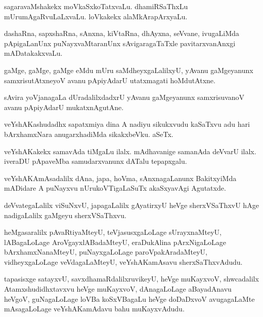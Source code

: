 \documentclass{article}
\begin{document}
\begin{mn}%
sagaravaMshakekx moVkaSxkoTatxvaLu. dhamiRSaThxLu mUrumAgaRvuLaLxvaLu. loVkakekx 
alaMkArapArxyaLu.
\end{mn}

\begin{mn}%
dashaRna, sapxshaRna, sAnxna, kiVtaRna, dhAyxna, seVvane, ivugaLiMda pApigaLanUnx 
puNayxvaMtaranUnx sAvigaragaTaTxle pavitarxvanAnxgi mADatakakxvaLu.
\end{mn}

\begin{mn}%
gaMge, gaMge, gaMge eMdu mUru saMdheyxgaLalilxyU, yAvanu gaMgeyanunx samxrisutAtxneyoV 
avanu pApiyAdarU utatxmagati hoMdutAtxne.
\end{mn}

\begin{mn}%
sAvira yoVjanagaLa dUradalilxdadxrU yAvanu gaMgeyanunx samxrisuvanoV avanu pApiyAdarU 
mukatxnAgutAne.
\end{mn}

\begin{mn}%
veYshAKashudadhx sapatxmiya dina A nadiyu sikukxvudu kaSaTxvu adu hari bArxhamxNara 
anugarxhadiMda sikakxbeVku. aSeTx.
\end{mn}

\begin{mn}%
veYshAKakekx samavAda tiMgaLu ilalx. mAdhavanige samanAda deVvarU ilalx. iveraDU pApaveMba 
samudarxvanunx dATalu tepapxgalu.
\end{mn}

\begin{mn}%
veYshAKAmAsadalilx dAna, japa, hoVma, sAnxnagaLanunx BakitxyiMda mADidare A puNayxvu 
nUrukoVTigaLaSuTx akaSxyavAgi Agutatxde.
\end{mn}

\begin{mn}%
deVvategaLalilx viSuNxvU, japagaLalilx gAyatirxyU heVge sherxVSaThxvU hAge nadigaLalilx 
gaMgeyu sherxVSaThxvu.
\end{mn}

\begin{mn}%
heMgasaralilx pAvaRtiyaMteyU, teVjasusxgaLoLage sUrayxnaMteyU, lABagaLoLage 
AroVgayxlABadaMteyU, eraDukAlina pArxNigaLoLage bArxhamxNanaMteyU, puNayxgaLoLage 
paroVpakAradaMteyU, vidheyxgaLoLage veVdagaLaMteyU, veYshAKamAsavu sherxSaThxvAdudu.
\end{mn}

\begin{mn}%
tapasisxge satayxvU, savxdhamaRdalilxruvikeyU, heVge muKayxvoV, shwcadalilx 
Atamxshudidhxtavxvu heVge muKayxvoV, dAnagaLoLage aBayadAnavu heVgoV, guNagaLoLage loVBa 
koSxVBagaLu heVge doDaDxvoV avugagaLaMte mAsagaLoLage veYshAKamAdavu bahu muKayxvAdudu.
\end{mn}
\end{document}

